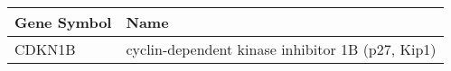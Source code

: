 \begin{tabular}{ll}
\toprule
Gene Symbol &                                             Name \\
\midrule
     CDKN1B & cyclin-dependent kinase inhibitor 1B (p27, Kip1) \\
\bottomrule
\end{tabular}
